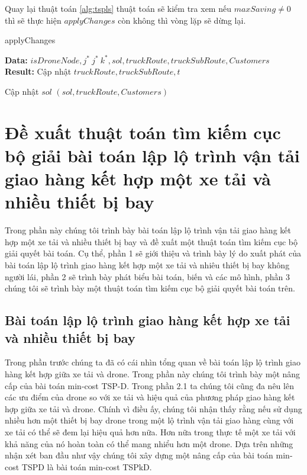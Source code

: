 \documentclass[a4paper,12pt]{report}
\begin{document}
Quay lại thuật toán \ref{alg:tspls} thuật toán sẽ kiểm tra xem nếu $maxSaving \neq 0$ thì sẽ thực hiện $applyChanges$ còn không thì vòng lặp sẽ dừng lại.
\begin{algorithm}[H]
\caption{applyChanges}
\textbf{Data:} $isDroneNode,j^* \ j^* \ k^*,sol,truckRoute,truckSubRoute,Customers$\\
\textbf{Result:} Cập nhật $truckRoute,truckSubRoute,t$\\
\begin{algorithmic}[1]
\Else 
{}
\EndIf
Cập nhật $sol$
\Return 	$(sol,truckRoute,Customers)$
\end{algorithmic}

\label{alg:tspls5}
\end{algorithm}
\chapter{Đề xuất thuật toán tìm kiếm cục bộ  giải bài toán  lập lộ trình vận tải giao hàng kết hợp một xe tải và nhiều thiết bị bay}
Trong phần này chúng tôi trình bày bài toán lập lộ trình vận tải giao hàng kết hợp một xe tải và nhiều thiết bị bay và đề xuất một thuật toán tìm kiếm cục bộ giải quyết bài toán. Cụ thể, phần 1 sẽ giới thiệu và trình bày lý do xuất phát của bài toán lập lộ trình giao hàng kết hợp một xe tải và  nhiêu thiết bị bay không người lái, phần 2 sẽ trình bày phát biểu bài toán, biến và các mô hình, phần 3 chúng tôi sẽ trình bày một thuật toán tìm kiếm cục bộ giải quyết bài toán trên.
\section{Bài toán lập lộ trình giao hàng kết hợp xe tải và nhiều thiết bị bay}
Trong phần trước chúng ta đã có cái nhìn tổng quan về bài toán lập lộ trình giao hàng kết hợp giữa xe tải và drone. Trong phần  này chúng tôi trình bày một nâng cấp của bài toán min-cost TSP-D. Trong phần 2.1 ta chúng tôi cũng đa nêu lên các ưu điểm của drone so với xe tải và hiệu quả của phương pháp giao hàng kết hợp giữa xe tải và drone. Chính vì điều ấy, chúng tôi nhận thấy rằng nếu sử dụng nhiều hơn một thiết bị bay drone trong một lộ trình vận tải giao hàng cùng với xe tải có thể sẽ đem lại hiệu quả hơn nữa. Hơn nữa trong thực tế một xe tải với khả năng của nó hoàn toàn có thể mang nhiểu hơn một drone. Dựa trên những nhận xét ban đầu như vậy chúng tôi xây dựng một nâng cấp của bài toán min-cost TSPD là bài toán min-cost TSPkD.
\end{document}

